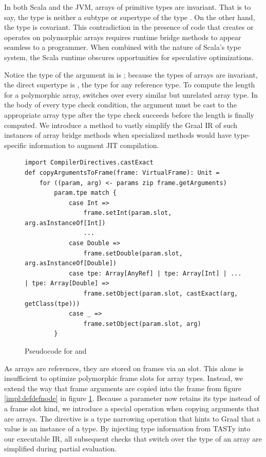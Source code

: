 In both Scala and the JVM, arrays of primitive types are invariant.
That is to say, the type  is neither a subtype or supertype of the type .
On the other hand, the type  is covariant.
This contradiction in the presence of code that creates or operates on polymorphic arrays requires runtime bridge methods to appear seamless to a programmer.
When combined with the nature of Scala's type system, the Scala runtime obscures opportunities for speculative optimizations.

Notice the type of the argument in  is ; because the types of arrays are invariant, the direct supertype is , the type for any reference type.
To compute the length for a polymorphic array,  switches over every similar but unrelated array type.
In the body of every type check condition, the argument must be cast to the appropriate array type after the type check succeeds before the length is finally computed.
We introduce a method to vastly simplify the Graal IR of such instances of array bridge methods when specialized methods would have type-specific information to augment JIT compilation.

\begin{figure}[!htb]
\begin{verbatim}
import CompilerDirectives.castExact
def copyArgumentsToFrame(frame: VirtualFrame): Unit = 
	for ((param, arg) <- params zip frame.getArguments) 
		param.tpe match {
			case Int =>
				frame.setInt(param.slot, arg.asInstanceOf[Int])
				...
			case Double =>
				frame.setDouble(param.slot, arg.asInstanceOf[Double])	
			case tpe: Array[AnyRef] | tpe: Array[Int] | ... | tpe: Array[Double] =>
				frame.setObject(param.slot, castExact(arg, getClass(tpe)))
			case _ =>
				frame.setObject(param.slot, arg)
		}
\end{verbatim}
\caption{Pseudocode for  and }
\label{impl:specialized-copy-arguments}
\end{figure}

As arrays are references, they are stored on frames via an  slot.
This alone is insufficient to optimize polymorphic frame slots for array types.
Instead, we extend the way that frame arguments are copied into the frame from figure \ref{impl:defdefnode} in figure \ref{impl:specialized-copy-arguments}.
Because a parameter now retains its type instead of a frame slot kind, we introduce a special operation when copying arguments that are arrays. 
The  directive is a type narrowing operation that hints to Graal that a value is an instance of a type.
By injecting type information from TASTy into our executable IR, all subsequent checks that switch over the type of an array are simplified during partial evaluation.

